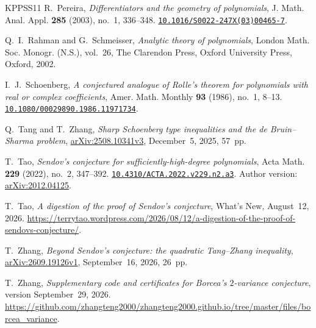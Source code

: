 \documentclass[11pt,reqno]{amsart}
\theoremstyle{definition}
\theoremstyle{remark}
\numberwithin{equation}{section}
\newcommand{\doi}[1]{\href{https://doi.org/#1}{\nolinkurl{#1}}}
\newcommand{\arxiv}[1]{\href{https://arxiv.org/abs/#1}{arXiv:#1}}
\begin{document}
\begin{thebibliography}{KPPSS11}
R.~Pereira, \emph{Differentiators and the geometry of polynomials}, J. Math. Anal. Appl. \textbf{285} (2003), no.~1, 336--348. \doi{10.1016/S0022-247X(03)00465-7}.

Q.~I.~Rahman and G.~Schmeisser, \emph{Analytic theory of polynomials}, London Math. Soc. Monogr. (N.S.), vol.~26, The Clarendon Press, Oxford University Press, Oxford, 2002.

I.~J.~Schoenberg, \emph{A conjectured analogue of Rolle's theorem for polynomials with real or complex coefficients}, Amer. Math. Monthly \textbf{93} (1986), no.~1, 8--13. \doi{10.1080/00029890.1986.11971734}.

Q.~Tang and T.~Zhang, \emph{Sharp Schoenberg type inequalities and the de Bruin--Sharma problem}, \arxiv{2508.10341v3}, December~5, 2025, 57~pp.

T.~Tao, \emph{Sendov's conjecture for sufficiently-high-degree polynomials}, Acta Math. \textbf{229} (2022), no.~2, 347--392. \doi{10.4310/ACTA.2022.v229.n2.a3}. Author version: \arxiv{2012.04125}.

T.~Tao, \emph{A digestion of the proof of Sendov's conjecture}, What's New, August~12, 2026. \url{https://terrytao.wordpress.com/2026/08/12/a-digestion-of-the-proof-of-sendovs-conjecture/}.

T.~Zhang, \emph{Beyond Sendov's conjecture: the quadratic Tang--Zhang inequality}, \arxiv{2609.19126v1}, September~16, 2026, 26~pp.

T.~Zhang, \emph{Supplementary code and certificates for Borcea's $2$-variance conjecture}, version September~29, 2026. \url{https://github.com/zhangteng2000/zhangteng2000.github.io/tree/master/files/borcea_variance}.

\end{thebibliography}
\end{document}
